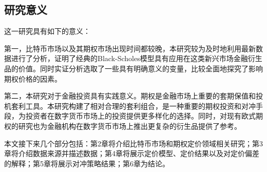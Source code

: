 \subsection{研究意义}
\par{这一研究具有如下的意义：}
\par{
  第一，比特币市场以及其期权市场出现时间都较晚，本研究较为及时地利用最新数据进行了分析，证明了经典的Black-Scholes模型具有应用在这类新兴市场金融衍生品的价值。同时实证分析选取了一些具有明确意义的变量，比较全面地探究了影响期权价格的因素。
}
\par{
  第二，本研究对于金融投资具有实践意义。期权是金融市场上重要的套期保值和投机套利工具。本研究构建了相对合理的套利组合，是一种重要的期权投资和对冲手段，为投资者在数字货币市场上的投资提供更多样化的选择。同时，对现有欧式期权的研究也为金融机构在数字货币市场上推出更复杂的衍生品提供了参考。
}
\par{本文接下来几个部分包括：第2章将介绍比特币市场和期权定价领域相关研究；第3章将介绍数据来源并描述数据；第4章将展示定价模型、定价结果以及对定价偏差的解释；第5章将展示对冲策略结果；第6章为结论。}